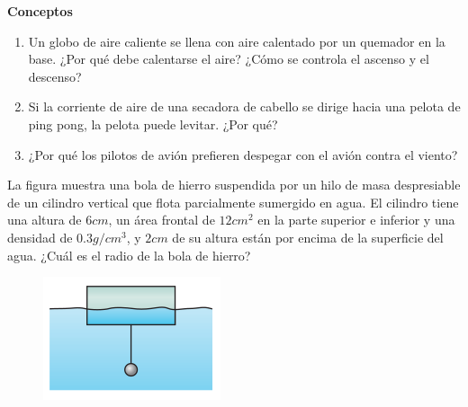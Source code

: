 \begin{mdframed}[style=warning]
	\textbf{Conceptos}
		\begin{enumerate}
			\item Un globo de aire caliente se llena con aire calentado por un quemador en la base. ¿Por qué debe calentarse el aire? ¿Cómo se controla el ascenso y el descenso?
			\item Si la corriente de aire de una secadora de cabello se dirige hacia una pelota de ping pong, la pelota puede levitar. ¿Por qué?
			\item ¿Por qué los pilotos de avión prefieren despegar con el avión contra el viento?
		\end{enumerate}
\end{mdframed}






\begin{mdframed}[style=warning]
	\begin{ejercicio}
		La figura muestra una bola de hierro suspendida por un hilo de masa despresiable de un cilindro vertical que flota parcialmente sumergido en agua. El cilindro tiene una altura de $6cm$, un área frontal de $12cm^2$ en la parte superior e inferior y una densidad de $0.3g/cm^3$, y $2cm$ de su altura están por encima de la superficie del agua. ¿Cuál es el radio de la bola de hierro?
		
		\begin{figure}[H]
			\centering
			\includegraphics[scale=0.5]{./img/p1.png}
		\end{figure}
	\end{ejercicio}
\end{mdframed}


























